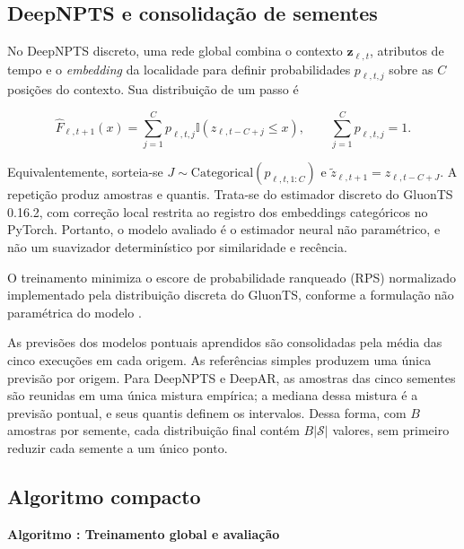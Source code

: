 \documentclass[10pt,conference,a4paper]{IEEEtran}
\newcounter{algoritmo}
\begin{document}
\subsection{DeepNPTS e consolidação de sementes}

No DeepNPTS discreto, uma rede global combina o contexto
$\mathbf z_{\ell,t}$, atributos de tempo e o \textit{embedding} da localidade
para definir probabilidades $p_{\ell,t,j}$ sobre as $C$ posições do contexto.
Sua distribuição de um passo é

\begin{equation}
 \widehat F_{\ell,t+1}(x)=\sum_{j=1}^{C}p_{\ell,t,j}
 \mathbb I(z_{\ell,t-C+j}\le x),\qquad \sum_{j=1}^{C}p_{\ell,t,j}=1.
 \label{eq:deepnpts}
\end{equation}

Equivalentemente, sorteia-se $J\sim\mathrm{Categorical}(p_{\ell,t,1:C})$ e
$\widetilde z_{\ell,t+1}=z_{\ell,t-C+J}$. A repetição produz amostras e
quantis. Trata-se do estimador discreto do GluonTS 0.16.2, com correção local
restrita ao registro dos embeddings categóricos no PyTorch. Portanto, o modelo
avaliado é o estimador neural não paramétrico, e não um suavizador
determinístico por similaridade e recência.

O treinamento minimiza o escore de probabilidade ranqueado (RPS) normalizado
implementado pela distribuição discreta do GluonTS, conforme a formulação
não paramétrica do modelo \cite{rangapuram2023}.

As previsões dos modelos pontuais aprendidos são consolidadas pela média das
cinco execuções em cada origem. As referências simples produzem uma única
previsão por origem.
Para DeepNPTS e DeepAR, as amostras das cinco sementes são reunidas em uma
única mistura empírica; a mediana dessa mistura é a previsão pontual, e seus
quantis definem os intervalos. Dessa forma, com $B$ amostras por semente, cada
distribuição final contém $B|\mathcal S|$ valores, sem primeiro reduzir cada
semente a um único ponto.

\subsection{Algoritmo compacto}

\label{alg:sistema}
\noindent\textbf{Algoritmo \thealgoritmo: Treinamento global e avaliação}
\end{document}

